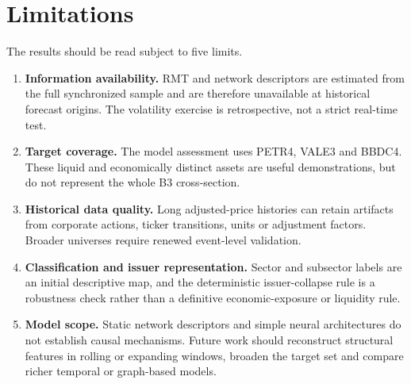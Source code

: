 \section{Limitations}
\label{sec:limitations}

The results should be read subject to five limits.
\begin{enumerate}
    \item \textbf{Information availability.} RMT and network descriptors are estimated from the full synchronized sample and are therefore unavailable at historical forecast origins. The volatility exercise is retrospective, not a strict real-time test.
    \item \textbf{Target coverage.} The model assessment uses PETR4, VALE3 and BBDC4. These liquid and economically distinct assets are useful demonstrations, but do not represent the whole B3 cross-section.
    \item \textbf{Historical data quality.} Long adjusted-price histories can retain artifacts from corporate actions, ticker transitions, units or adjustment factors. Broader universes require renewed event-level validation.
    \item \textbf{Classification and issuer representation.} Sector and subsector labels are an initial descriptive map, and the deterministic issuer-collapse rule is a robustness check rather than a definitive economic-exposure or liquidity rule.
    \item \textbf{Model scope.} Static network descriptors and simple neural architectures do not establish causal mechanisms. Future work should reconstruct structural features in rolling or expanding windows, broaden the target set and compare richer temporal or graph-based models.
\end{enumerate}

